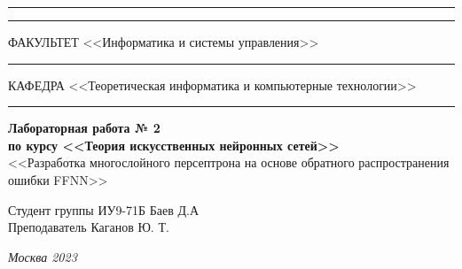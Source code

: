 \documentclass[a4paper, 14pt]{extarticle}
\begin{document}
\begin{titlepage}
\vspace{-25pt}
\hspace{-35pt}\rule{\textwidth}{2.3pt}

\vspace*{-20.3pt}
\hspace{-35pt}\rule{\textwidth}{0.4pt}

\vspace{1.5ex}
\hspace{-35pt} \noindent \small ФАКУЛЬТЕТ\hspace{80pt} <<Информатика и системы управления>>

\vspace*{-16pt}
\hspace{47pt}\rule{0.83\textwidth}{0.4pt}

\vspace{0.5ex}
\hspace{-35pt} \noindent \small КАФЕДРА\hspace{50pt} <<Теоретическая информатика и компьютерные технологии>>

\vspace*{-16pt}
\hspace{30pt}\rule{0.866\textwidth}{0.4pt}

\vspace{11em}

\begin{center}
\Large {\bf Лабораторная работа № 2} \\
\large {\bf по курсу <<Теория искусственных нейронных сетей>>} \\
\large <<Разработка многослойного персептрона
на основе обратного распространения ошибки FFNN>>
\end{center}\normalsize

\vspace{8em}


\begin{flushright}
  {Студент группы ИУ9-71Б Баев Д.А \hspace*{15pt}\\
  \vspace{2ex}
  Преподаватель Каганов Ю. Т.\hspace*{15pt}}
\end{flushright}

\bigskip

\vfill


\begin{center}
\textsl{Москва 2023}
\end{center}
\end{titlepage}
\end{document}
